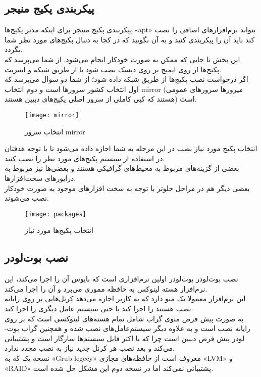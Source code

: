 \subsection{پیکربندی پکیج منیجر}
\begin{frame}{پیکربندی پکیج منیجر}
  برای اینکه مدیر پکیج‌ها «apt» بتواند نرم‌افزارهای اضافی را نصب کند باید آن را پیکربندی کنید و به آن بگویید که در کجا به دنبال پکیج‌های مورد نظر شما بگردد.\\
  این بخش تا جایی که ممکن به صورت خودکار انجام می‌شود. از شما می‌پرسد که پکیج‌ها از روی ایمیج بر روی دیسک نصب شود یا از طریق شبکه و اینترنت.\\
  اگر درخواست نصب پکیج‌ها از طریق شبکه داده شود؛ از شما دو سوال می‌پرسد که اول انتخاب کشور سرورها است و دوم انتخاب mirror (میرور‌ها سرورهای عمومی هستند که کپی کاملی از سرور اصلی پکیج‌های دبیین هستند) است.
  \begin{figure}
    \texttt{[image: mirror]}
    \caption{انتخاب سرور mirror~\cite{fig:deb_mirror}}
  \end{figure}
\end{frame}
\begin{frame}{انتخاب پکیج مورد نیاز نصب}
  در این مرحله به شما اجازه داده می‌شود تا با توجه هدفتان در استفاده از سیستم پکیج‌های مورد نظر را نصب کنید.\\
  بعضی از گزینه‌های مربوط به محیط‌های گرافیکی هستند و بعضی‌ها نیز مربوط به درایورهای سخت‌افزارها.\\
  بعضی دیگر هم در مراحل جلوتر با توجه به سخت افزار‌های موجود به صورت خودکار نصب می‌شوند.\\
  \begin{figure}
    \texttt{[image: packages]}
    \caption{انتخاب پکیج‌ها مورد نیاز~\cite{fig:deb_packages}}
  \end{figure}
\end{frame}
\subsection{نصب بوت‌لودر}
\begin{frame}{نصب بوت‌لودر}
  بوت‌لودر اولین نرم‌افزاری است که بایوس آن را اجرا می‌کند، این نرم‌افزار هسته لینوکس به حافظه مموری می‌برد و آن را اجرا می‌کند.\\
  این نرم‌افزار معمولا یک منو دارد که به کاربر اجازه می‌دهد کرنل‌هایی بر روی رایانه نصب هستند را اجرا کند یا حتی سیستم عامل دیگری را اجرا کند.\\
  به صورت پیش فرض منوی گراب شامل تمام هسته‌های لینوکسی است که بر روی رایانه نصب است و به علاوه دیگر سیستم‌عامل‌های نصب شده و همچنین گراب بوت-لودر پیش فرض دبیین است چرا که با اکثر فایل سیستم‌ها سازگار است و پشتیبانی می‌کند و بعد نصب هر کرنل جدید نیاز به نصب مجدد ندارد.\\
  نسخه یک که به «Grub legecy» معروف است از حافظه‌های مجازی «LVM» و «RAID» پشتیبانی نمی‌کند اما در نسخه دوم این مشکل حل شده است.\\
\end{frame}
